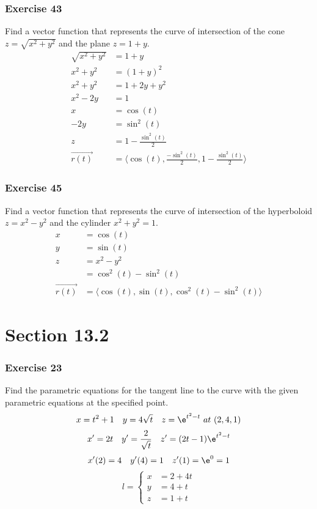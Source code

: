 \documentclass[letterpaper, 12pt]{math}
\begin{document}
\subsubsection*{Exercise 43}
Find a vector function that represents the curve of intersection of the cone
\( z = \sqrt{x^2+y^2} \) and the plane \( z = 1+y \).
\begin{align*}
  \sqrt{x^2+y^2} &= 1+y \\
  x^2+y^2 &= (1+y)^2 \\
  x^2+y^2 &= 1+2y+y^2 \\
  x^2-2y &= 1 \\
  x &= \cos(t) \\
  -2y &= \sin^2(t) \\
  z &= 1-\frac{\sin^2(t)}{2} \\
  \overrightarrow{r(t)} &=
    \langle\cos(t),\frac{-\sin^2(t)}{2},1-\frac{\sin^2(t)}{2}\rangle
\end{align*}

\subsubsection*{Exercise 45}
Find a vector function that represents the curve of intersection of the
hyperboloid \( z = x^2-y^2 \) and the cylinder \( x^2+y^2 = 1 \).
\begin{align*}
  x &= \cos(t) \\
  y &= \sin(t) \\
  z &= x^2-y^2 \\
  &= \cos^2(t)-\sin^2(t) \\
  \overrightarrow{r(t)} &= \langle\cos(t),\sin(t),\cos^2(t)-\sin^2(t)\rangle
\end{align*}

\section*{Section 13.2}

\subsubsection*{Exercise 23}
Find the parametric equations for the tangent line to the curve with the
given parametric equations at the specified point.
\[ x = t^2+1 \quad y = 4\sqrt{t} \quad z = \e^{t^2-t}\ at\ (2,4,1) \]
\[ x' = 2t \quad y' = \frac{2}{\sqrt{t}} \quad z' = (2t-1)\e^{t^2-t} \]
\[ x'(2) = 4 \quad y'(4) = 1 \quad z'(1) = \e^0 = 1 \]
\[ l = \begin{cases}
  x &= 2+4t \\
  y &= 4+t \\
  z &= 1+t
\end{cases} \]
\end{document}
